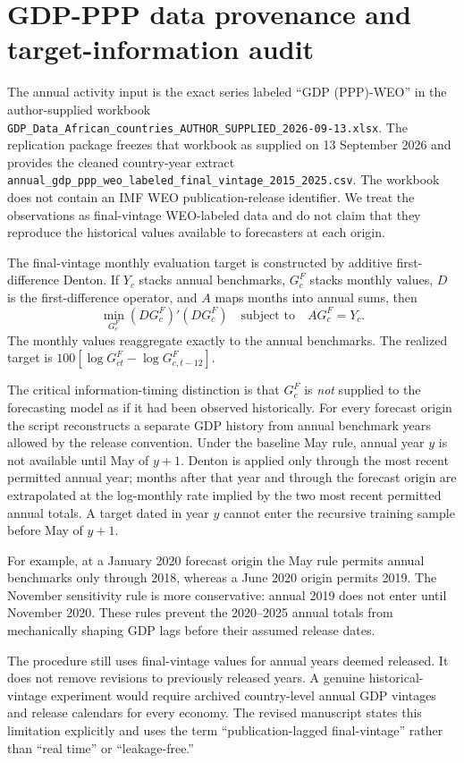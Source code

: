 \documentclass[12pt]{article}
\begin{document}
\section{GDP-PPP data provenance and target-information audit}
The annual activity input is the exact series labeled ``GDP (PPP)-WEO'' in the author-supplied workbook \nolinkurl{GDP_Data_African_countries_AUTHOR_SUPPLIED_2026-09-13.xlsx}. The replication package freezes that workbook as supplied on 13 September 2026 and provides the cleaned country-year extract \nolinkurl{annual_gdp_ppp_weo_labeled_final_vintage_2015_2025.csv}. The workbook does not contain an IMF WEO publication-release identifier. We treat the observations as final-vintage WEO-labeled data and do not claim that they reproduce the historical values available to forecasters at each origin.

The final-vintage monthly evaluation target is constructed by additive first-difference Denton. If $Y_c$ stacks annual benchmarks, $G_c^F$ stacks monthly values, $D$ is the first-difference operator, and $A$ maps months into annual sums, then
\[
\min_{G_c^F}(DG_c^F)'(DG_c^F)\quad\text{subject to}\quad AG_c^F=Y_c.
\]
The monthly values reaggregate exactly to the annual benchmarks. The realized target is $100[\log G^F_{ct}-\log G^F_{c,t-12}]$.

The critical information-timing distinction is that $G_c^F$ is \emph{not} supplied to the forecasting model as if it had been observed historically. For every forecast origin the script reconstructs a separate GDP history from annual benchmark years allowed by the release convention. Under the baseline May rule, annual year $y$ is not available until May of $y+1$. Denton is applied only through the most recent permitted annual year; months after that year and through the forecast origin are extrapolated at the log-monthly rate implied by the two most recent permitted annual totals. A target dated in year $y$ cannot enter the recursive training sample before May of $y+1$.

For example, at a January 2020 forecast origin the May rule permits annual benchmarks only through 2018, whereas a June 2020 origin permits 2019. The November sensitivity rule is more conservative: annual 2019 does not enter until November 2020. These rules prevent the 2020--2025 annual totals from mechanically shaping GDP lags before their assumed release dates.

The procedure still uses final-vintage values for annual years deemed released. It does not remove revisions to previously released years. A genuine historical-vintage experiment would require archived country-level annual GDP vintages and release calendars for every economy. The revised manuscript states this limitation explicitly and uses the term ``publication-lagged final-vintage'' rather than ``real time'' or ``leakage-free.''
\end{document}

